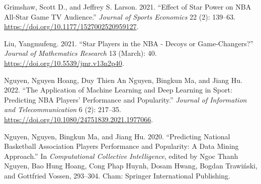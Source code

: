 \documentclass[
]{article}
\newlength{\cslhangindent}
\newlength{\cslentryspacingunit} %
\newenvironment{CSLReferences}[2] %
 {%
  \setlength{\parindent}{0pt}
  \ifodd #1
  \let\oldpar\par
  \def\par{\hangindent=\cslhangindent\oldpar}
  \fi
  \setlength{\parskip}{#2\cslentryspacingunit}
 }%
 {}
\begin{document}
\hypertarget{refs}{}
\begin{CSLReferences}{1}{0}
\leavevmode{}%
Grimshaw, Scott D., and Jeffrey S. Larson. 2021. {``Effect of Star Power on NBA All-Star Game TV Audience.''} \emph{Journal of Sports Economics} 22 (2): 139--63. \url{https://doi.org/10.1177/1527002520959127}.

\leavevmode{}%
Liu, Yangmufeng. 2021. {``Star Players in the NBA - Decoys or Game-Changers?''} \emph{Journal of Mathematics Research} 13 (March): 40. \url{https://doi.org/10.5539/jmr.v13n2p40}.

\leavevmode{}%
Nguyen, Nguyen Hoang, Duy Thien An Nguyen, Bingkun Ma, and Jiang Hu. 2022. {``The Application of Machine Learning and Deep Learning in Sport: Predicting NBA Players' Performance and Popularity.''} \emph{Journal of Information and Telecommunication} 6 (2): 217--35. \url{https://doi.org/10.1080/24751839.2021.1977066}.

\leavevmode{}%
Nguyen, Nguyen, Bingkun Ma, and Jiang Hu. 2020. {``Predicting National Basketball Association Players Performance and Popularity: A Data Mining Approach.''} In \emph{Computational Collective Intelligence}, edited by Ngoc Thanh Nguyen, Bao Hung Hoang, Cong Phap Huynh, Dosam Hwang, Bogdan Trawiński, and Gottfried Vossen, 293--304. Cham: Springer International Publishing.

\end{CSLReferences}
\end{document}
